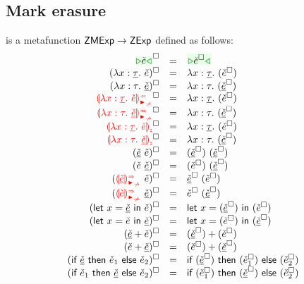 \documentclass[formalism.tex]{subfiles}
\begin{document}
\subsection{Mark erasure}
\label{sec:typed-mark-erasure}
\judgbox{\ensuremath{\erase{\ZCMV}}} is a metafunction ${\normalfont\textsf{ZMExp}} \to {\normalfont\textsf{ZExp}}$ defined as follows:
%
\newcommand{\erasesToRow}[2]{\erase{#1} & = & #2}
\[\begin{array}{rcl}
  \erasesToRow{\ZCCursor{\ECMV}}{\ZCCursor{\erase{\ECMV}}} \\
  \erasesToRow{(\ZCLamT{x}{\ZTMV}{\ECMV})}{\ZCLamT{x}{\ZTMV}{(\erase{\ECMV})}} \\
  \erasesToRow{(\ZCLamE{x}{\TMV}{\ZCMV})}{\ZCLamE{x}{\TMV}{(\erase{\ZCMV})}} \\
  \erasesToRow{\ZCLamAnaNonMatchedArrowT{x}{\ZTMV}{\ECMV}}{\ZCLamT{x}{\ZTMV}{(\erase{\ECMV})}} \\
  \erasesToRow{\ZCLamAnaNonMatchedArrowE{x}{\TMV}{\ZCMV}}{\ZCLamE{x}{\TMV}{(\erase{\ZCMV})}} \\
  \erasesToRow{\ZCLamInconAscT{x}{\ZTMV}{\ECMV}}{\ZCLamT{x}{\ZTMV}{(\erase{\ECMV})}} \\
  \erasesToRow{\ZCLamInconAscE{x}{\TMV}{\ZCMV}}{\ZCLamE{x}{\TMV}{(\erase{\ZCMV})}} \\
  \erasesToRow{(\ZCApL{\ZCMV}{\ECMV})}{\ZCApL{(\erase{\ZCMV})}{(\erase{\ZCMV})}} \\
  \erasesToRow{(\ZCApR{\ECMV}{\ZCMV})}{\ZCApR{(\erase{\ECMV})}{(\erase{\ZCMV})}} \\
  \erasesToRow{(\ZCApSynNonMatchedArrowL{\ZCMV}{\ECMV})}{\ZCApL{\erase{\ZCMV}}{(\erase{\ECMV})}} \\
  \erasesToRow{(\ZCApSynNonMatchedArrowR{\ECMV}{\ZCMV})}{\ZCApR{\erase{\ECMV}}{(\erase{\ZCMV})}} \\
  \erasesToRow{(\ZCLetL{x}{\ZCMV}{\ECMV})}{\ZCLetL{x}{(\erase{\ZCMV})}{(\erase{\ECMV})}} \\
  \erasesToRow{(\ZCLetR{x}{\ECMV}{\ZCMV})}{\ZCLetR{x}{(\erase{\ECMV})}{(\erase{\ZCMV})}} \\
  \erasesToRow{(\ZCPlusL{\ZCMV}{\ECMV})}{\ZCPlusL{(\erase{\ZCMV})}{(\erase{\ECMV})}} \\
  \erasesToRow{(\ZCPlusR{\ECMV}{\ZCMV})}{\ZCPlusR{(\erase{\ECMV})}{(\erase{\ZCMV})}} \\
  \erasesToRow{(\ZCIfC{\ZCMV}{\ECMV_1}{\ECMV_2})}{\ZCIfC{(\erase{\ZCMV})}{(\erase{\ECMV_1})}{(\erase{\ECMV_2})}} \\
  \erasesToRow{(\ZCIfL{\ECMV_1}{\ZCMV}{\ECMV_2})}{\ZCIfL{(\erase{\ECMV_1})}{(\erase{\ZCMV})}{(\erase{\ECMV_2})}} \\

\end{array}\]
\end{document}
